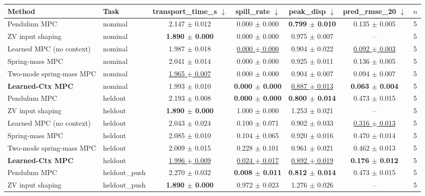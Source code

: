\begin{tabular}{llccccc}
\toprule
Method & Task & transport\_time\_s $\downarrow$ & spill\_rate $\downarrow$ & peak\_disp $\downarrow$ & pred\_rmse\_20 $\downarrow$ & $n$ \\
\midrule
Pendulum MPC & nominal & 2.147 $\pm$ 0.012 & 0.000 $\pm$ 0.000 & \textbf{0.799 $\pm$ 0.010} & 0.135 $\pm$ 0.005 & 5 \\
ZV input shaping & nominal & \textbf{1.890 $\pm$ 0.000} & 0.000 $\pm$ 0.000 & 0.975 $\pm$ 0.007 & -- & 5 \\
Learned MPC (no context) & nominal & 1.987 $\pm$ 0.018 & \underline{0.000 $\pm$ 0.000} & 0.904 $\pm$ 0.022 & \underline{0.092 $\pm$ 0.003} & 5 \\
Spring-mass MPC & nominal & 2.041 $\pm$ 0.014 & 0.000 $\pm$ 0.000 & 0.925 $\pm$ 0.011 & 0.136 $\pm$ 0.005 & 5 \\
Two-mode spring-mass MPC & nominal & \underline{1.965 $\pm$ 0.007} & 0.000 $\pm$ 0.000 & 0.904 $\pm$ 0.007 & 0.094 $\pm$ 0.007 & 5 \\
\textbf{Learned-Ctx MPC} & nominal & 1.993 $\pm$ 0.010 & \textbf{0.000 $\pm$ 0.000} & \underline{0.887 $\pm$ 0.013} & \textbf{0.063 $\pm$ 0.004} & 5 \\
\midrule
Pendulum MPC & heldout & 2.193 $\pm$ 0.008 & \textbf{0.000 $\pm$ 0.000} & \textbf{0.800 $\pm$ 0.014} & 0.473 $\pm$ 0.015 & 5 \\
ZV input shaping & heldout & \textbf{1.890 $\pm$ 0.000} & 1.000 $\pm$ 0.000 & 1.253 $\pm$ 0.021 & -- & 5 \\
Learned MPC (no context) & heldout & 2.043 $\pm$ 0.024 & 0.100 $\pm$ 0.071 & 0.902 $\pm$ 0.033 & \underline{0.316 $\pm$ 0.013} & 5 \\
Spring-mass MPC & heldout & 2.085 $\pm$ 0.010 & 0.104 $\pm$ 0.065 & 0.920 $\pm$ 0.016 & 0.470 $\pm$ 0.014 & 5 \\
Two-mode spring-mass MPC & heldout & 2.009 $\pm$ 0.015 & 0.228 $\pm$ 0.101 & 0.961 $\pm$ 0.021 & 0.462 $\pm$ 0.013 & 5 \\
\textbf{Learned-Ctx MPC} & heldout & \underline{1.996 $\pm$ 0.009} & \underline{0.024 $\pm$ 0.017} & \underline{0.892 $\pm$ 0.019} & \textbf{0.176 $\pm$ 0.012} & 5 \\
\midrule
Pendulum MPC & heldout\_push & 2.270 $\pm$ 0.032 & \textbf{0.008 $\pm$ 0.011} & \textbf{0.812 $\pm$ 0.014} & 0.473 $\pm$ 0.015 & 5 \\
ZV input shaping & heldout\_push & \textbf{1.890 $\pm$ 0.000} & 0.972 $\pm$ 0.023 & 1.276 $\pm$ 0.026 & -- & 5 \\

\end{tabular}
